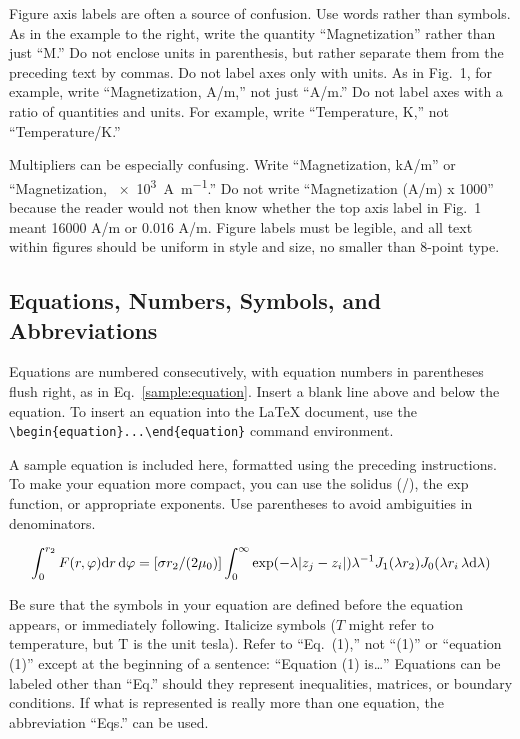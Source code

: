 \documentclass[conf]{new-aiaa}
\begin{document}
Figure axis labels are often a source of confusion. Use words rather than symbols. As in the example to the right, write the quantity ``Magnetization'' rather than just ``M.'' Do not enclose units in parenthesis, but rather separate them from the preceding text by commas. Do not label axes only with units. As in Fig.~1, for example, write ``Magnetization, \si[per-mode=symbol]{\ampere\per\meter},'' not just ``A/m.'' Do not label axes with a ratio of quantities and units. For example, write ``Temperature, K,'' not ``Temperature/K.''

Multipliers can be especially confusing. Write ``Magnetization, \si[per-mode=symbol]{\kilo\ampere\per\meter}'' or ``Magnetization, \SI[per-mode=symbol]{e3}{\ampere\per\meter}.'' Do not write ``Magnetization (A/m) x 1000'' because the reader would not then know whether the top axis label in Fig.~1 meant 16000 A/m or 0.016 A/m. Figure labels must be legible, and all text within figures should be uniform in style and size, no smaller than 8-point type.

\subsection{Equations, Numbers, Symbols, and Abbreviations}
Equations are numbered consecutively, with equation numbers in parentheses flush right, as in Eq.~\eqref{sample:equation}. Insert a blank line above and below the equation. To insert an equation into the \LaTeX{} document, use the \verb|\begin{equation}...\end{equation}| command environment.

A sample equation is included here, formatted using the preceding instructions. To make your equation more compact, you can use the solidus (/), the exp function, or appropriate exponents. Use parentheses to avoid ambiguities in denominators.

\begin{equation}
\label{sample:equation}
\int^{r_2}_0 F(r,\varphi){\rm d}r\,{\rm d}\varphi = [\sigma r_2/(2\mu_0)]\int^{\infty}_0\exp(-\lambda|z_j-z_i|)\lambda^{-1}J_1 (\lambda r_2)J_0 (\lambda r_i\,\lambda {\rm d}\lambda)
\end{equation}

Be sure that the symbols in your equation are defined before the equation appears, or immediately following. Italicize symbols ($T$ might refer to temperature, but T is the unit tesla). Refer to ``Eq.~(1),'' not ``(1)'' or ``equation (1)'' except at the beginning of a sentence: ``Equation (1) is\ldots'' Equations can be labeled other than ``Eq.'' should they represent inequalities, matrices, or boundary conditions. If what is represented is really more than one equation, the abbreviation ``Eqs.'' can be used.
\end{document}
